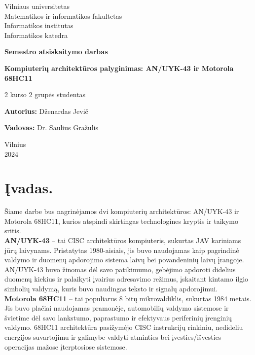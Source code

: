 \documentclass[a4paper,12pt]{article}
\begin{document}
\begin{titlepage}
    \centering
    {\large Vilniaus universitetas \\ Matematikos ir informatikos fakultetas \\ Informatikos institutas \\ Informatikos katedra \par}
    \vspace{2cm}
    {\LARGE \textbf{Semestro atsiskaitymo darbas} \par}
    \vspace{1cm}
    {\LARGE \textbf{Kompiuterių architektūros palyginimas: AN/UYK-43 ir Motorola 68HC11} \par}
    {\large {} \par}
    \vspace{3cm}
    {\large 2 kurso 2 grupės studentas \par}
    \vspace{0.5cm}
    {\large \textbf{Autorius:} Dženardas Jevič \par}
    {\large \textbf{Vadovas:} Dr. Saulius Gražulis \par}
    \vfill
    {\large Vilnius \\ 2024 \par}
\end{titlepage}

\newpage
\tableofcontents
\newpage

\section{Įvadas.}
Šiame darbe bus nagrinėjamos dvi kompiuterių architektūros: AN/UYK-43 ir Motorola 68HC11, kurios atspindi skirtingas technologines kryptis ir taikymo sritis.\\
\textbf{AN/UYK-43} – tai CISC architektūros kompiuteris, sukurtas JAV kariniams jūrų laivynams. Pristatytas 1980-aisiais, jis buvo naudojamas kaip pagrindinė valdymo ir duomenų apdorojimo sistema laivų bei povandeninių laivų įrangoje. AN/UYK-43 buvo žinomas dėl savo patikimumo, gebėjimo apdoroti didelius duomenų kiekius ir palaikyti įvairius adresavimo režimus, įskaitant kintamo ilgio simbolių valdymą, kuris buvo naudingas teksto ir signalų apdorojimui.\\
\textbf{Motorola 68HC11} – tai populiarus 8 bitų mikrovaldiklis, sukurtas 1984 metais. Jis buvo plačiai naudojamas pramonėje, automobilių valdymo sistemose ir švietime dėl savo lankstumo, paprastumo ir efektyvaus periferinių įrenginių valdymo. 68HC11 architektūra pasižymėjo CISC instrukcijų rinkiniu, nedideliu energijos suvartojimu ir galimybe valdyti atminties bei įvesties/išvesties operacijas mažose įterptosiose sistemose.
\end{document}
